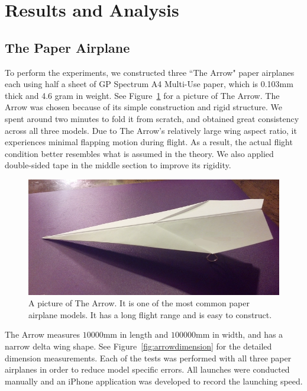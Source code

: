 \section{Results and Analysis}

\subsection{The Paper Airplane}

To perform the experiments, we constructed three ``The Arrow" paper airplanes each using half a sheet of GP Spectrum A4 Multi-Use paper, 
which is 0.103mm thick and 4.6 gram in weight. See Figure~\ref{fig:arrow} for a picture of The Arrow. The Arrow was chosen because
of its simple construction and rigid structure. We spent around two minutes to fold it from scratch, and obtained great consistency across 
all three models. Due to The Arrow's relatively large wing aspect ratio, it experiences minimal flapping motion during flight. As a result, the actual 
flight condition better resembles what is assumed in the theory. We also applied double-sided tape in the middle section to improve its rigidity.

\begin{figure}[hl]
  \centering
    \includegraphics[scale=0.7]{figures/arrow.png}
    \caption{A picture of The Arrow. It is one of the most common paper airplane models. It has a long flight range and 
		         is easy to construct.}
  \label{fig:arrow}
\end{figure}

The Arrow measures $10000$mm in length and $100000$mm in width, and has a narrow delta wing shape. See Figure~\ref{fig:arrowdimension} for the detailed
dimension measurements. Each of the tests was performed with all three paper airplanes in order to reduce model specific errors. All launches were conducted
manually and an iPhone application was developed to record the launching speed.
 
